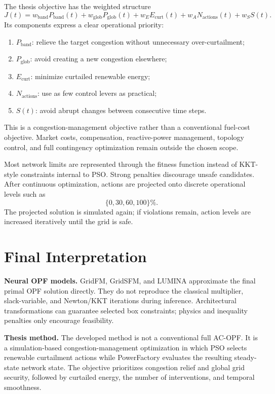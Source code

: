 \documentclass[11pt,a4paper]{article}
\begin{document}
The thesis objective has the weighted structure
\[
J(t)=w_{\mathrm{band}}P_{\mathrm{band}}(t)
+w_{\mathrm{glob}}P_{\mathrm{glob}}(t)
+w_EE_{\mathrm{curt}}(t)
+w_AN_{\mathrm{actions}}(t)
+w_SS(t).
\]
Its components express a clear operational priority:
\begin{enumerate}
  \item $P_{\mathrm{band}}$: relieve the target congestion without unnecessary over-curtailment;
  \item $P_{\mathrm{glob}}$: avoid creating a new congestion elsewhere;
  \item $E_{\mathrm{curt}}$: minimize curtailed renewable energy;
  \item $N_{\mathrm{actions}}$: use as few control levers as practical;
  \item $S(t)$: avoid abrupt changes between consecutive time steps.
\end{enumerate}
This is a congestion-management objective rather than a conventional fuel-cost objective. Market costs, compensation, reactive-power management, topology control, and full contingency optimization remain outside the chosen scope.

Most network limits are represented through the fitness function instead of KKT-style constraints internal to PSO. Strong penalties discourage unsafe candidates. After continuous optimization, actions are projected onto discrete operational levels such as
\[
\{0,30,60,100\}\%.
\]
The projected solution is simulated again; if violations remain, action levels are increased iteratively until the grid is safe.

\section{Final Interpretation}

\begin{keybox}
\textbf{Neural OPF models.} GridFM, GridSFM, and LUMINA approximate the final primal OPF solution directly. They do not reproduce the classical multiplier, slack-variable, and Newton/KKT iterations during inference. Architectural transformations can guarantee selected box constraints; physics and inequality penalties only encourage feasibility.
\end{keybox}

\begin{keybox}
\textbf{Thesis method.} The developed method is not a conventional full AC-OPF. It is a simulation-based congestion-management optimization in which PSO selects renewable curtailment actions while PowerFactory evaluates the resulting steady-state network state. The objective prioritizes congestion relief and global grid security, followed by curtailed energy, the number of interventions, and temporal smoothness.
\end{keybox}
\end{document}

